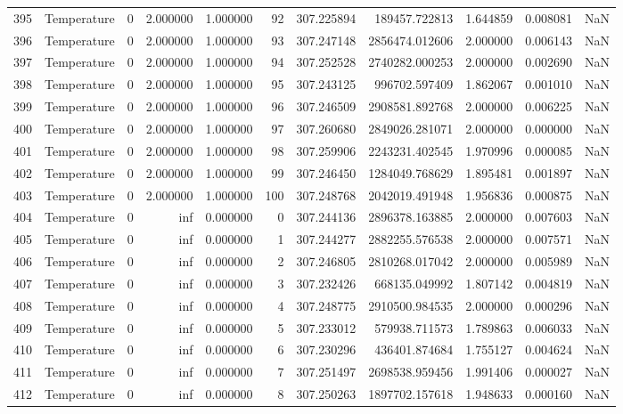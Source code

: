 \begin{tabular}{llrrrrrrrrr}
395 & Temperature & 0 & 2.000000 & 1.000000 & 92 & 307.225894 & 189457.722813 & 1.644859 & 0.008081 & NaN \\
396 & Temperature & 0 & 2.000000 & 1.000000 & 93 & 307.247148 & 2856474.012606 & 2.000000 & 0.006143 & NaN \\
397 & Temperature & 0 & 2.000000 & 1.000000 & 94 & 307.252528 & 2740282.000253 & 2.000000 & 0.002690 & NaN \\
398 & Temperature & 0 & 2.000000 & 1.000000 & 95 & 307.243125 & 996702.597409 & 1.862067 & 0.001010 & NaN \\
399 & Temperature & 0 & 2.000000 & 1.000000 & 96 & 307.246509 & 2908581.892768 & 2.000000 & 0.006225 & NaN \\
400 & Temperature & 0 & 2.000000 & 1.000000 & 97 & 307.260680 & 2849026.281071 & 2.000000 & 0.000000 & NaN \\
401 & Temperature & 0 & 2.000000 & 1.000000 & 98 & 307.259906 & 2243231.402545 & 1.970996 & 0.000085 & NaN \\
402 & Temperature & 0 & 2.000000 & 1.000000 & 99 & 307.246450 & 1284049.768629 & 1.895481 & 0.001897 & NaN \\
403 & Temperature & 0 & 2.000000 & 1.000000 & 100 & 307.248768 & 2042019.491948 & 1.956836 & 0.000875 & NaN \\
404 & Temperature & 0 & inf & 0.000000 & 0 & 307.244136 & 2896378.163885 & 2.000000 & 0.007603 & NaN \\
405 & Temperature & 0 & inf & 0.000000 & 1 & 307.244277 & 2882255.576538 & 2.000000 & 0.007571 & NaN \\
406 & Temperature & 0 & inf & 0.000000 & 2 & 307.246805 & 2810268.017042 & 2.000000 & 0.005989 & NaN \\
407 & Temperature & 0 & inf & 0.000000 & 3 & 307.232426 & 668135.049992 & 1.807142 & 0.004819 & NaN \\
408 & Temperature & 0 & inf & 0.000000 & 4 & 307.248775 & 2910500.984535 & 2.000000 & 0.000296 & NaN \\
409 & Temperature & 0 & inf & 0.000000 & 5 & 307.233012 & 579938.711573 & 1.789863 & 0.006033 & NaN \\
410 & Temperature & 0 & inf & 0.000000 & 6 & 307.230296 & 436401.874684 & 1.755127 & 0.004624 & NaN \\
411 & Temperature & 0 & inf & 0.000000 & 7 & 307.251497 & 2698538.959456 & 1.991406 & 0.000027 & NaN \\
412 & Temperature & 0 & inf & 0.000000 & 8 & 307.250263 & 1897702.157618 & 1.948633 & 0.000160 & NaN \\

\end{tabular}
